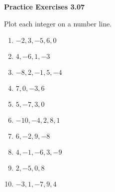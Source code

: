 \vspace{0.3ex}
\noindent\textbf{Practice Exercises 3.07}

\vspace{0.2ex}

Plot each integer on a number line.
\begin{multicols}{2}
\begin{enumerate}[noitemsep, label = \color{blue}\arabic*. ]
    \item \( -2, 3, -5, 6, 0 \)
    \item \( 4, -6, 1, -3 \)
    \item \( -8, 2, -1, 5, -4 \)
    \item \( 7, 0, -3, 6 \)
    \item \( 5, -7, 3, 0 \)
    \item \( -10, -4, 2, 8, 1 \)
    \item \( 6, -2, 9, -8 \)
    \item \( 4, -1, -6, 3, -9 \)
    \item \( 2, -5, 0, 8 \)
    \item \( -3, 1, -7, 9, 4 \)
\end{enumerate}
\end{multicols}




